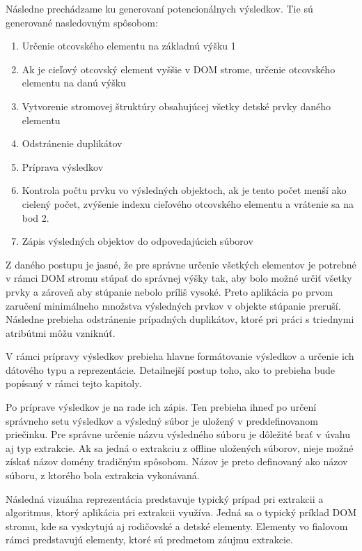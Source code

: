 Následne prechádzame ku generovaní potencionálnych výsledkov. Tie sú generované nasledovným spôsobom:

\bigskip

\begin{enumerate}
    \item Určenie otcovského elementu na základnú výšku 1
    \item Ak je cieľový otcovský element vyššie v DOM strome, určenie otcovského elementu na danú výšku
    \item Vytvorenie stromovej štruktúry obsahujúcej všetky detské prvky daného elementu
    \item Odstránenie duplikátov
    \item Príprava výsledkov
    \item Kontrola počtu prvku vo výsledných objektoch, ak je tento počet menší ako cielený počet, zvýšenie indexu cieľového otcovského elementu a vrátenie sa na bod 2.
    \item Zápis výsledných objektov do odpovedajúcich súborov
\end{enumerate}

\bigskip

Z daného postupu je jasné, že pre správne určenie všetkých elementov je potrebné v rámci DOM stromu stúpať do správnej výšky tak, aby bolo možné určiť všetky prvky a zároveň aby stúpanie nebolo príliš vysoké. Preto aplikácia po prvom zaručení minimálneho množstva výsledných prvkov v objekte stúpanie preruší. Následne prebieha odstránenie prípadných duplikátov, ktoré pri práci s triednymi atribútmi môžu vzniknúť.

V rámci prípravy výsledkov prebieha hlavne formátovanie výsledkov a určenie ich dátového typu a reprezentácie. Detailnejší postup toho, ako to prebieha bude popísaný v rámci tejto kapitoly. 

Po príprave výsledkov je na rade ich zápis. Ten prebieha ihneď po určení správneho setu výsledkov a výsledný súbor je uložený v preddefinovanom priečinku. Pre správne určenie názvu výsledného súboru je dôležité brať v úvahu aj typ extrakcie. Ak sa jedná o extrakciu z offline uložených súborov, nieje možné získať názov domény tradičným spôsobom. Názov je preto definovaný ako názov súboru, z ktorého bola extrakcia vykonávaná. 

\newpage

Následná vizuálna reprezentácia predstavuje typický prípad pri extrakcii a algoritmus, ktorý aplikácia pri extrakcii využíva. Jedná sa o typický príklad DOM stromu, kde sa vyskytujú aj rodičovské a detské elementy. Elementy vo fialovom rámci predstavujú elementy, ktoré sú predmetom záujmu extrakcie. 

